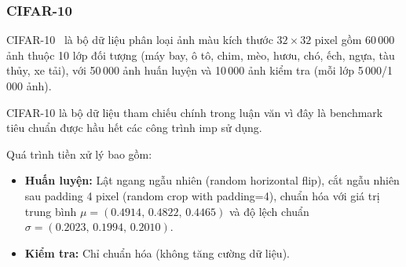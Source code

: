             
            
            
            \subsubsection{CIFAR-10}
            \label{subsec:cifar10}
     
            CIFAR-10~\cite{krizhevsky2009learning} là bộ dữ liệu phân loại ảnh màu
            kích thước $32 \times 32$ pixel gồm 60\,000 ảnh thuộc 10 lớp đối tượng
            (máy bay, ô tô, chim, mèo, hươu, chó, ếch, ngựa, tàu thủy, xe tải),
            với 50\,000 ảnh huấn luyện và 10\,000 ảnh kiểm tra (mỗi lớp 5\,000/1\,000 ảnh).
            
            CIFAR-10 là bộ dữ liệu tham chiếu chính trong luận văn vì đây là \gls{benchmark}
            tiêu chuẩn được hầu hết các công trình \gls{imp} sử dụng.
            
            Quá trình tiền xử lý bao gồm:
            \begin{itemize}
                \item \textbf{Huấn luyện:} Lật ngang ngẫu nhiên (random horizontal flip),
                    cắt ngẫu nhiên sau padding 4 pixel (random crop with padding=4),
                    chuẩn hóa với giá trị trung bình $\mu = (0.4914,\,0.4822,\,0.4465)$
                    và độ lệch chuẩn $\sigma = (0.2023,\,0.1994,\,0.2010)$.
                \item \textbf{Kiểm tra:} Chỉ chuẩn hóa (không tăng cường dữ liệu).
            \end{itemize}
            
